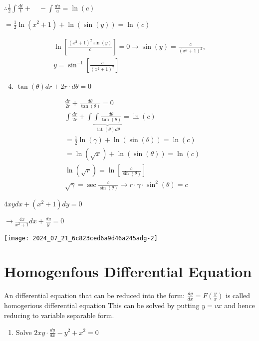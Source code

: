 \documentclass[12pt, a4paper]{article}
\begin{document}
$\therefore \frac{1}{2} \int \frac{d t}{t}+\quad-\int \frac{d u}{u}=\ln (c)$

$=\frac{1}{2} \ln \left(x^{2}+1\right)+\ln (\sin (y))=\ln (c)$

$$
\begin{array}{r}
\ln \left[\frac{\left(x^{2}+1\right)^{2} \sin (y)}{c}\right]=0 \rightarrow \sin (y)=\frac{c}{\left(x^{2}+1\right)^{2}}, \\
y=\sin ^{-1}\left[\frac{c}{\left(x^{2}+1\right)^{2}}\right]
\end{array}
$$

\begin{enumerate}
  \setcounter{enumi}{3}
  \item $\tan (\theta) d r+2 r \cdot d \theta=0$
\end{enumerate}

$$
\begin{aligned}
& \frac{d r}{2 r}+\frac{d \theta}{\tan (\theta)}=0 \\
& \int \frac{d r}{2 r}+\int \underbrace{\int \frac{d \theta}{\tan (\theta)}}_{\operatorname{tat}(\theta) d \theta}=\ln (c) \\
& =\frac{1}{2} \ln (\gamma)+\ln (\sin (\theta))=\ln (c) \\
& =\ln (\sqrt{x})+\ln (\sin (\theta))=\ln (c) \\
& \ln (\sqrt{r})=\ln \left[\frac{c}{\sin (\theta)}\right] \\
& \sqrt{\gamma}=\sec \frac{c}{\sin (\theta)} \longrightarrow r \cdot \gamma \cdot \sin ^{2}(\theta)=c
\end{aligned}
$$

$4 x y d x+\left(x^{2}+1\right) d y=0$

$\rightarrow \frac{4 x}{x^{2}+1} d x+\frac{d y}{y}=0$

\begin{center}
\texttt{[image: 2024\_07\_21\_6c823ced6a9d46a245adg-2]}
\end{center}

\section*{Homogenfous Differential Equation}
An differential equation that can be reduced into the form: $\frac{d y}{d x}=F\left(\frac{y}{x}\right)$ is called homogerious differential equation This can be solved by putting $y=v x$ and hence reducing to variable separable form.

\begin{enumerate}
  \item Solve $2 x y \cdot \frac{d y}{d x}-y^{2}+x^{2}=0$
\end{enumerate}
\end{document}
